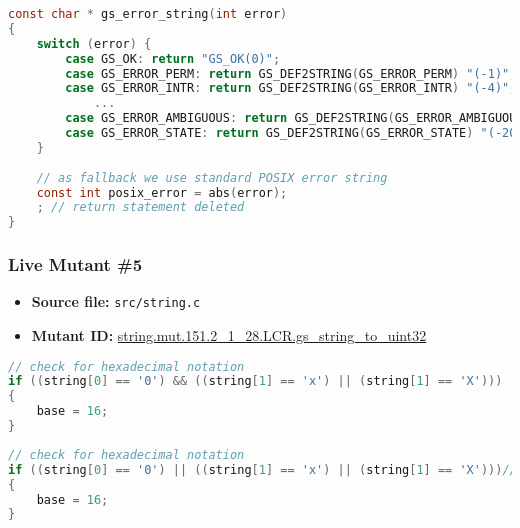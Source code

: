 \begin{lstlisting}[language=C, label=live_4, caption=Mutant source code.]
const char * gs_error_string(int error)
{
    switch (error) {
        case GS_OK: return "GS_OK(0)";
        case GS_ERROR_PERM: return GS_DEF2STRING(GS_ERROR_PERM) "(-1)";
        case GS_ERROR_INTR: return GS_DEF2STRING(GS_ERROR_INTR) "(-4)";
            ...
        case GS_ERROR_AMBIGUOUS: return GS_DEF2STRING(GS_ERROR_AMBIGUOUS) "(-2009)";
        case GS_ERROR_STATE: return GS_DEF2STRING(GS_ERROR_STATE) "(-2010)";
    }
   
    // as fallback we use standard POSIX error string
    const int posix_error = abs(error);
    ; // return statement deleted
}
\end{lstlisting}



\subsubsection{Live Mutant \#5}

\begin{itemize}
\item \textbf{Source file:} \texttt{src/string.c}
\item \textbf{Mutant ID:} \url{string.mut.151.2_1_28.LCR.gs_string_to_uint32}
\end{itemize}

\begin{lstlisting}[language=C, label=live_5, caption=Original source code.]
 // check for hexadecimal notation
if ((string[0] == '0') && ((string[1] == 'x') || (string[1] == 'X')))                                                             
{
    base = 16;
}
\end{lstlisting}

\begin{lstlisting}[language=C, label=live_5, caption=Mutant source code.]
// check for hexadecimal notation
if ((string[0] == '0') || ((string[1] == 'x') || (string[1] == 'X')))// '&&' changed into '||' 
{
    base = 16;
}
\end{lstlisting}






